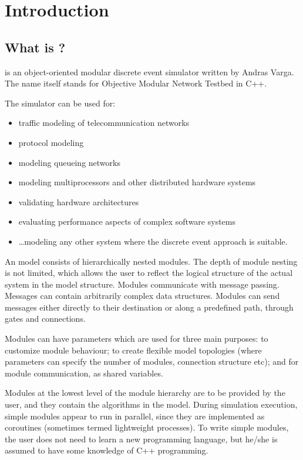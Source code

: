 \chapter{Introduction}
\label{cha:introduction}


\section{What is {\opp}?}

{\opp} is an object-oriented modular discrete event simulator
written by Andras Varga.
The name itself stands for Objective Modular Network Testbed
in C++.

The simulator can be used for:
\begin{itemize}
  \item{traffic modeling of telecommunication networks}
  \item{protocol modeling}
  \item{modeling queueing networks}
  \item{modeling multiprocessors and other distributed hardware systems}
  \item{validating hardware architectures}
  \item{evaluating performance aspects of complex software systems}
  \item{\dots modeling any other system where the discrete event approach is
    suitable.}
\end{itemize}


An {\opp} model consists of hierarchically nested modules. The
depth of module nesting is not limited, which allows the user
to reflect the logical structure of the actual system in the
model structure. Modules communicate with message passing. Messages
can contain arbitrarily complex data structures. Modules can
send messages either directly to their destination or along a
predefined path, through gates and connections.


Modules can have parameters which are used for three main purposes:
to customize module behaviour; to create flexible model topologies
(where parameters can specify the number of modules, connection
structure etc); and for module communication, as shared variables.

Modules at the lowest level of the module hierarchy are to be
provided by the user, and they contain the algorithms in the
model. During simulation execution, simple modules appear to
run in parallel, since they are implemented as coroutines (sometimes
termed lightweight processes). To write simple modules, the user
does not need to learn a new programming language, but he/she
is assumed to have some knowledge of C++ programming.

